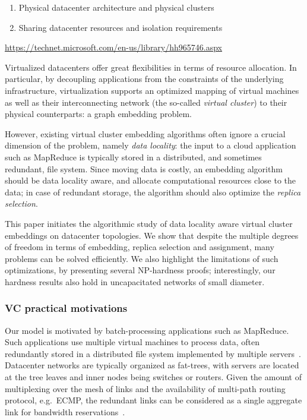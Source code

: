 
\begin{enumerate}
  \item Physical datacenter architecture and physical clusters
  \item Sharing datacenter resources and isolation requirements
\end{enumerate}

\url{https://technet.microsoft.com/en-us/library/hh965746.aspx}


Virtualized datacenters offer great flexibilities in terms of resource allocation. In particular, by
decoupling applications from the constraints of the underlying infrastructure, virtualization
supports an optimized mapping of virtual machines as well as their interconnecting network
 (the so-called \emph{virtual cluster})
to their
physical counterparts: a graph embedding problem.

However, existing virtual cluster embedding algorithms often ignore a crucial dimension of the problem, namely \emph{data locality}:
the input to a cloud application such as MapReduce is typically stored in a distributed,
and sometimes redundant, file system. Since moving
data is costly, an embedding algorithm should be data locality aware,
and allocate computational resources close to the data; in case of redundant storage, the algorithm should also optimize the \emph{replica selection}.

This paper initiates the algorithmic study of data locality aware virtual cluster embeddings
on datacenter topologies.
We
show that
despite the multiple degrees of freedom in terms of embedding, replica selection and assignment,
many problems can be
solved efficiently. We also highlight the limitations of such optimizations,
by presenting several NP-hardness proofs; interestingly,
our hardness results also hold in uncapacitated networks of small diameter.

\subsubsection{VC practical motivations}

Our model is motivated by batch-processing applications such as MapReduce.
Such applications use multiple virtual machines to
process data, often redundantly stored in a distributed file system implemented
by multiple servers~\cite{local-schedule-1,mapreduce}.
Datacenter networks are typically organized as fat-trees, with servers are
located at the tree leaves and inner nodes being switches or routers.
Given the amount of multiplexing over the mesh of links
and the availability of multi-path routing protocol, e.g.~ECMP, the redundant
links can be considered as a single aggregate link for bandwidth
reservations~\cite{oktopus,infocom16,ccr15emb,proteus}.

